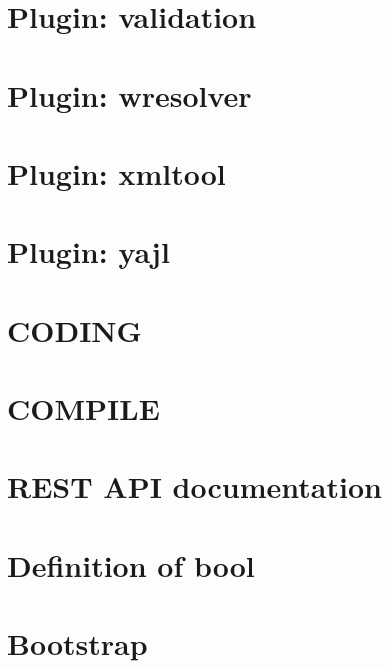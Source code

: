 \documentclass[twoside]{book}
\newcommand{\+}{\discretionary{\mbox{\scriptsize$\hookleftarrow$}}{}{}}
\begin{document}
\chapter{Plugin\+: validation}
\label{md_src_plugins_validation_README}
\hypertarget{md_src_plugins_validation_README}{}

\chapter{Plugin\+: wresolver}
\label{md_src_plugins_wresolver_README}
\hypertarget{md_src_plugins_wresolver_README}{}

\chapter{Plugin\+: xmltool}
\label{md_src_plugins_xmltool_README}
\hypertarget{md_src_plugins_xmltool_README}{}

\chapter{Plugin\+: yajl}
\label{md_src_plugins_yajl_README}
\hypertarget{md_src_plugins_yajl_README}{}

\chapter{C\+O\+D\+I\+N\+G}
\label{doc_CODING_md}
\hypertarget{doc_CODING_md}{}

\chapter{C\+O\+M\+P\+I\+L\+E}
\label{doc_COMPILE_md}
\hypertarget{doc_COMPILE_md}{}

\chapter{R\+E\+S\+T A\+P\+I documentation}
\label{doc_decisions_api_documentation_md}
\hypertarget{doc_decisions_api_documentation_md}{}

\chapter{Definition of bool}
\label{doc_decisions_bool_md}
\hypertarget{doc_decisions_bool_md}{}

\chapter{Bootstrap}
\label{doc_decisions_bootstrap_md}
\hypertarget{doc_decisions_bootstrap_md}{}

\end{document}
